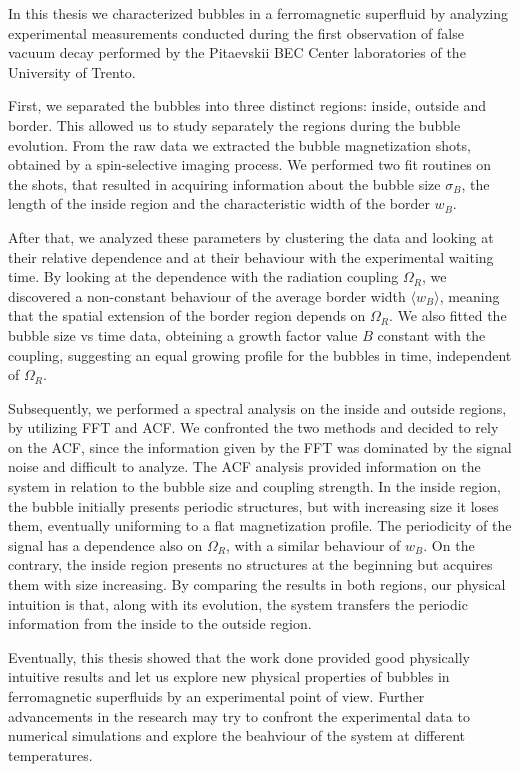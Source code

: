 In this thesis we characterized bubbles in a ferromagnetic superfluid by analyzing experimental measurements conducted during the first observation of false vacuum decay performed by the Pitaevskii BEC Center laboratories of the University of Trento. 

First, we separated the bubbles into three distinct regions: inside, outside and border. This allowed us to study separately the regions during the bubble evolution. From the raw data we extracted the bubble magnetization shots, obtained by a spin-selective imaging process. We performed two fit routines on the shots, that resulted in acquiring information about the bubble size $\sigma_B$, the length of the inside region and the characteristic width of the border $w_B$. 

After that, we analyzed these parameters by clustering the data and looking at their relative dependence and at their behaviour with the experimental waiting time. By looking at the dependence with the radiation coupling $\Omega_R$, we discovered a non-constant behaviour of the average border width $\langle w_B\rangle$, meaning that the spatial extension of the border region depends on $\Omega_R$. We also fitted the bubble size vs time data, obteining a growth factor value $B$ constant with the coupling, suggesting an equal growing profile for the bubbles in time, independent of $\Omega_R$.

Subsequently, we performed a spectral analysis on the inside and outside regions, by utilizing FFT and ACF. We confronted the two methods and decided to rely on the ACF, since the information given by the FFT was dominated by the signal noise and difficult to analyze. The ACF analysis provided information on the system in relation to the bubble size and coupling strength. In the inside region, the bubble initially presents periodic structures, but with increasing size it loses them, eventually uniforming to a flat magnetization profile. The periodicity of the signal has a dependence also on $\Omega_R$, with a similar behaviour of $w_B$. On the contrary, the inside region presents no structures at the beginning but acquires them with size increasing. By comparing the results in both regions, our physical intuition is that, along with its evolution, the system transfers the periodic information from the inside to the outside region.

Eventually, this thesis showed that the work done provided good physically intuitive results and let us explore new physical properties of bubbles in ferromagnetic superfluids by an experimental point of view. Further advancements in the research may try to confront the experimental data to numerical simulations and explore the beahviour of the system at different temperatures.
